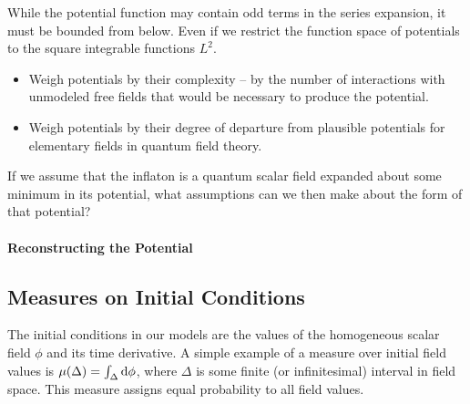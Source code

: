 While the potential function may contain odd terms in the series expansion, it must be bounded from below.  Even if we restrict the function space of potentials to the square integrable functions $L^2$.


\begin{itemize}
    
    \item Weigh potentials by their complexity -- by the number of interactions with unmodeled free fields that would be necessary to produce the potential.
    \item Weigh potentials by their degree of departure from plausible potentials for elementary fields in quantum field theory.

\end{itemize}

If we assume that the inflaton is a quantum scalar field expanded about some minimum in its potential, what assumptions can we then make about the form of that potential?

\paragraph{Reconstructing the Potential}

\subsection{Measures on Initial Conditions}

    The initial conditions in our models are the values of the homogeneous scalar field $\phi$ and its time derivative.  A simple example of a measure over initial field values is $\mu(\Delta) = \int_\Delta \mathrm d \phi$, where $\Delta$ is some finite (or infinitesimal) interval in field space.  This measure assigns equal probability to all field values.
    
